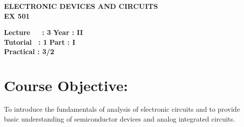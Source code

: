 \begin{center}
    \textbf{\huge{\uppercase{Electronic Devices and Circuits}}}
    \\
    \vspace{.5cm}
    \textbf{\large{EX 501}}
\end{center}

\noindent\textbf{Lecture\ \ \ : 3} \hfill \textbf{Year : II } \\
\textbf{Tutorial \ : 1} \hfill \textbf{Part : I } \\
\textbf{Practical : 3/2}  \\

\par
\noindent 
\section*{Course Objective:}
To introduce the fundamentals of analysis of electronic circuits and to provide basic understanding of semiconductor devices and analog integrated circuits.

